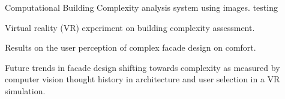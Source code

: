 
\item Computational Building Complexity analysis system using images. testing
\item Virtual reality (VR) experiment on building complexity assessment.
\item Results on the user perception of complex facade design on comfort.
\item Future trends in facade design shifting towards complexity as measured by computer vision thought history in architecture and user selection in a VR simulation.
